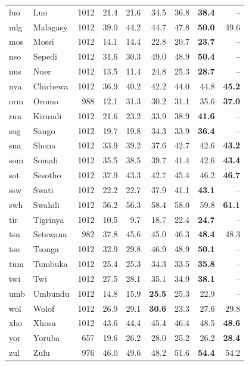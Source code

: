 \begin{table}[t]
\begin{tabular}{@{}llrrrrrrr@{}}
luo & Luo & 1012 & 21.4 & 21.6 & 34.5 & 36.8 & \textbf{38.4} & -- \\
mlg & Malagasy & 1012 & 39.0 & 44.2 & 44.7 & 47.8 & \textbf{50.0} & 49.6 \\
mos & Mossi & 1012 & 14.1 & 14.4 & 22.8 & 20.7 & \textbf{23.7} & -- \\
nso & Sepedi & 1012 & 31.6 & 30.3 & 49.0 & 48.9 & \textbf{50.4} & -- \\
nus & Nuer & 1012 & 13.5 & 11.4 & 24.8 & 25.3 & \textbf{28.7} & -- \\
nya & Chichewa & 1012 & 36.9 & 40.2 & 42.2 & 44.0 & 44.8 & \textbf{45.2} \\
orm & Oromo & 988 & 12.1 & 31.3 & 30.2 & 31.1 & 35.6 & \textbf{37.0} \\
run & Kirundi & 1012 & 21.6 & 23.2 & 33.9 & 38.9 & \textbf{41.6} & -- \\
sag & Sango & 1012 & 19.7 & 19.8 & 34.3 & 33.9 & \textbf{36.4} & -- \\
sna & Shona & 1012 & 33.9 & 39.2 & 37.6 & 42.7 & 42.6 & \textbf{43.2} \\
som & Somali & 1012 & 35.5 & 38.5 & 39.7 & 41.4 & 42.6 & \textbf{43.4} \\
sot & Sesotho & 1012 & 37.9 & 43.3 & 42.7 & 45.4 & 46.2 & \textbf{46.7} \\
ssw & Swati & 1012 & 22.2 & 22.7 & 37.9 & 41.1 & \textbf{43.1} & -- \\
swh & Swahili & 1012 & 56.2 & 56.3 & 58.4 & 58.0 & 59.8 & \textbf{61.1} \\
tir & Tigrinya & 1012 & 10.5 & 9.7 & 18.7 & 22.4 & \textbf{24.7} & -- \\
tsn & Setswana & 982 & 37.8 & 45.6 & 45.0 & 46.3 & \textbf{48.4} & 48.3 \\
tso & Tsonga & 1012 & 32.9 & 29.8 & 46.9 & 48.9 & \textbf{50.1} & -- \\
tum & Tumbuka & 1012 & 25.4 & 25.3 & 34.3 & 33.5 & \textbf{35.8} & -- \\
twi & Twi & 1012 & 27.5 & 28.1 & 35.1 & 34.9 & \textbf{38.1} & -- \\
umb & Umbundu & 1012 & 14.8 & 15.9 & \textbf{25.5} & 25.3 & 22.9 & -- \\
wol & Wolof & 1012 & 26.9 & 29.1 & \textbf{30.6} & 23.3 & 27.6 & 29.8 \\
xho & Xhosa & 1012 & 43.6 & 44.4 & 45.4 & 46.4 & 48.5 & \textbf{48.6} \\
yor & Yoruba & 657 & 19.6 & 26.2 & 28.0 & 25.2 & 26.2 & \textbf{28.4} \\
zul & Zulu & 976 & 46.0 & 49.6 & 48.2 & 51.6 & \textbf{54.4} & 54.2 \\

\end{tabular}
\end{table}
